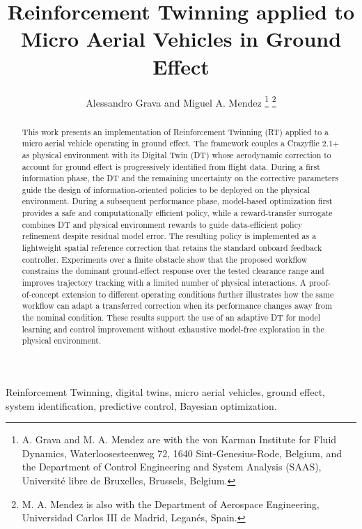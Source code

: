 \documentclass[journal]{IEEEtran}
\begin{document}
\title{Reinforcement Twinning applied to Micro Aerial Vehicles in Ground Effect}

\author{Alessandro Grava and Miguel A. Mendez%
\thanks{A. Grava and M. A. Mendez are with the von Karman Institute for Fluid Dynamics, Waterloosesteenweg 72, 1640 Sint-Genesius-Rode, Belgium, and the Department of Control Engineering and System Analysis (SAAS), Universit\'e libre de Bruxelles, Brussels, Belgium.}%
\thanks{M. A. Mendez is also with the Department of Aerospace Engineering, Universidad Carlos III de Madrid, Legan\'es, Spain.}}

\markboth{}{}
\maketitle

\begin{abstract}This work presents an implementation of Reinforcement Twinning (RT) applied to a micro aerial vehicle operating in ground effect. The framework couples a Crazyflie 2.1+ as physical environment with its Digital Twin (DT) whose aerodynamic correction to account for ground effect is progressively identified from flight data. During a first information phase, the DT and the remaining uncertainty on the corrective parameters guide the design of information-oriented policies to be deployed on the physical environment. During a subsequent performance phase, model-based optimization first provides a safe and computationally efficient policy, while a reward-transfer surrogate combines DT and physical environment rewards to guide data-efficient policy refinement despite residual model error. The resulting policy is implemented as a lightweight spatial reference correction that retains the standard onboard feedback controller. Experiments over a finite obstacle show that the proposed workflow constrains the dominant ground-effect response over the tested clearance range and improves trajectory tracking with a limited number of physical interactions. A proof-of-concept extension to different operating conditions further illustrates how the same workflow can adapt a transferred correction when its performance changes away from the nominal condition. These results support the use of an adaptive DT for model learning and control improvement without exhaustive model-free exploration in the physical environment.\end{abstract}

\begin{IEEEkeywords}Reinforcement Twinning, digital twins, micro aerial vehicles, ground effect, system identification, predictive control, Bayesian optimization.\end{IEEEkeywords}
\end{document}
